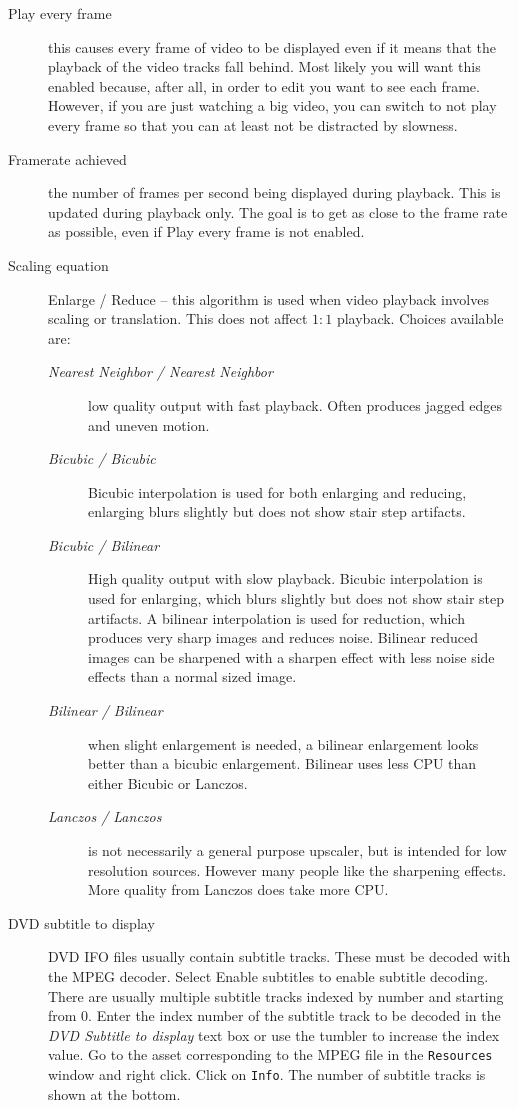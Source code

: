 \begin{description}
    \item[Play every frame] this causes every frame of video to be displayed even if it means that the playback of the video tracks fall behind. Most likely you will want this enabled because, after all, in order to edit you want to see each frame.  However, if you are just watching a big video, you can switch to not play every frame so that you can at least not be distracted by slowness.
    \item[Framerate achieved] the number of frames per second being displayed during playback. This is updated during playback only.  The goal is to get as close to the frame rate as possible, even if Play every frame is not enabled.
    \item[Scaling equation] Enlarge / Reduce -- this algorithm is used when video playback involves scaling or translation. This does not affect $1:1$ playback.  Choices available are:
    \begin{description}
        \item[\textit{Nearest Neighbor / Nearest Neighbor}] low quality output with fast playback. Often produces jagged edges and uneven motion.
        \item[\textit{Bicubic / Bicubic}] Bicubic interpolation is used for both enlarging and reducing, enlarging blurs slightly but does not show stair step artifacts.
        \item[\textit{Bicubic / Bilinear}] High quality output with slow playback. Bicubic interpolation is used for enlarging, which blurs slightly but does not show stair step artifacts. A bilinear interpolation is used for reduction, which produces very sharp images and reduces noise. Bilinear reduced images can be sharpened with a sharpen effect with less noise side effects than a normal sized image.
        \item[\textit{Bilinear / Bilinear}] when slight enlargement is needed, a bilinear enlargement looks better than a bicubic enlargement.  Bilinear uses less CPU than either Bicubic or Lanczos.
        \item[\textit{Lanczos / Lanczos}] is not necessarily a general purpose upscaler, but is intended for low resolution sources. However many people like the sharpening effects.  More quality from Lanczos does take more CPU.
    \end{description}
    \item[DVD subtitle to display] DVD IFO files usually contain subtitle tracks. These must be decoded with the MPEG decoder. Select Enable subtitles to enable subtitle decoding. There are usually multiple  subtitle tracks indexed by number and starting from 0. Enter the index number of the subtitle track to be decoded in the \textit{DVD Subtitle to display} text box or use the tumbler to increase the index value. Go to the asset corresponding to the MPEG file in the \texttt{Resources} window and right click. Click on \texttt{Info}. The number of subtitle tracks is shown at the bottom.

\end{description}
